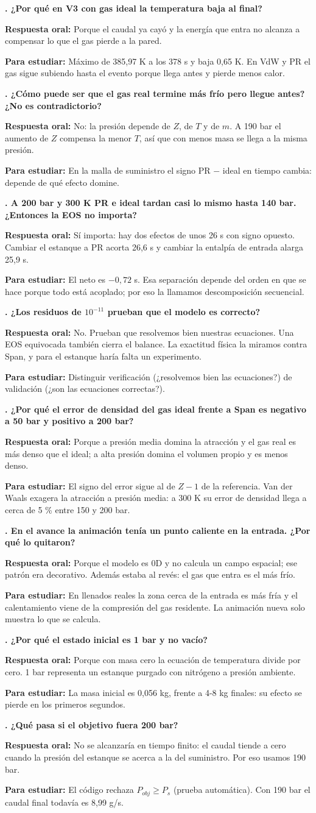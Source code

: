 \documentclass[11pt]{article}
\newcounter{preg}
\newcommand{\pregunta}[3]{\stepcounter{preg}%
\begin{tcolorbox}[colback=white,colframe=tinta!25,boxrule=0.5pt,sharp corners,left=6pt,right=6pt,top=4pt,bottom=4pt,breakable]
\textbf{\color{tinta}\thepreg. #1}\par\smallskip
\textbf{Respuesta oral:} #2\par\smallskip
{\color{gris}\small\textbf{Para estudiar:} #3}
\end{tcolorbox}}
\begin{document}
\pregunta{¿Por qué en V3 con gas ideal la temperatura baja al final?}
{Porque el caudal ya cayó y la energía que entra no alcanza a compensar lo que el gas pierde a la pared.}
{Máximo de 385,97 K a los 378 s y baja 0,65 K. En VdW y PR el gas sigue subiendo hasta el evento porque llega antes y pierde menos calor.}

\pregunta{¿Cómo puede ser que el gas real termine más frío pero llegue antes? ¿No es contradictorio?}
{No: la presión depende de $Z$, de $T$ y de $m$. A 190 bar el aumento de $Z$ compensa la menor $T$, así que con menos masa se llega a la misma presión.}
{En la malla de suministro el signo PR $-$ ideal en tiempo cambia: depende de qué efecto domine.}

\pregunta{A 200 bar y 300 K PR e ideal tardan casi lo mismo hasta 140 bar. ¿Entonces la EOS no importa?}
{Sí importa: hay dos efectos de unos 26 s con signo opuesto. Cambiar el estanque a PR acorta 26,6 s y cambiar la entalpía de entrada alarga 25,9 s.}
{El neto es $-0{,}72$ s. Esa separación depende del orden en que se hace porque todo está acoplado; por eso la llamamos descomposición secuencial.}

\pregunta{¿Los residuos de $10^{-11}$ prueban que el modelo es correcto?}
{No. Prueban que resolvemos bien nuestras ecuaciones. Una EOS equivocada también cierra el balance. La exactitud física la miramos contra Span, y para el estanque haría falta un experimento.}
{Distinguir verificación (¿resolvemos bien las ecuaciones?) de validación (¿son las ecuaciones correctas?).}

\pregunta{¿Por qué el error de densidad del gas ideal frente a Span es negativo a 50 bar y positivo a 200 bar?}
{Porque a presión media domina la atracción y el gas real es más denso que el ideal; a alta presión domina el volumen propio y es menos denso.}
{El signo del error sigue al de $Z-1$ de la referencia. Van der Waals exagera la atracción a presión media: a 300 K su error de densidad llega a cerca de 5 \% entre 150 y 200 bar.}

\pregunta{En el avance la animación tenía un punto caliente en la entrada. ¿Por qué lo quitaron?}
{Porque el modelo es 0D y no calcula un campo espacial; ese patrón era decorativo. Además estaba al revés: el gas que entra es el más frío.}
{En llenados reales la zona cerca de la entrada es más fría y el calentamiento viene de la compresión del gas residente. La animación nueva solo muestra lo que se calcula.}

\pregunta{¿Por qué el estado inicial es 1 bar y no vacío?}
{Porque con masa cero la ecuación de temperatura divide por cero. 1 bar representa un estanque purgado con nitrógeno a presión ambiente.}
{La masa inicial es 0,056 kg, frente a 4-8 kg finales: su efecto se pierde en los primeros segundos.}

\pregunta{¿Qué pasa si el objetivo fuera 200 bar?}
{No se alcanzaría en tiempo finito: el caudal tiende a cero cuando la presión del estanque se acerca a la del suministro. Por eso usamos 190 bar.}
{El código rechaza $P_{obj}\ge P_s$ (prueba automática). Con 190 bar el caudal final todavía es 8,99 g/s.}
\end{document}
